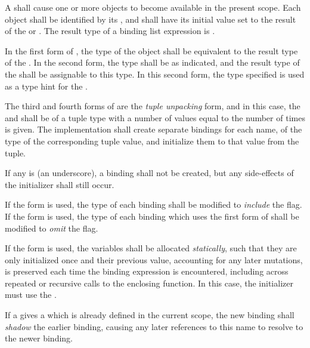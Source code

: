 \specsubsubitem
A  shall cause one or more objects to become
available in the present scope. Each object shall be identified by its
, and shall have its initial value set to the result of the
 or . The result
type of a binding list expression is .

\specsubsubitem
In the first form of , the type of the object shall
be equivalent to the result type of the . In the
second form, the type shall be as indicated, and the result type of the
 shall be assignable to this type. In this second form,
the type specified is used as a type hint for the .

\specsubsubitem
The third and fourth forms of  are the \textit{tuple
unpacking} form, and in this case, the  and
 shall be of a tuple type with a number of values equal
to the number of times  is given. The implementation shall
create separate bindings for each name, of the type of the corresponding tuple
value, and initialize them to that value from the tuple.

\specsubsubitem
If any  is \terminal{\_} (an underscore), a binding shall not
be created, but any side-effects of the initializer shall still occur.

\specsubsubitem
If the  form is used, the type of each binding shall be
modified to \textit{include} the  flag. If the 
form is used, the type of each binding which uses the first form of
 shall be modified to \textit{omit} the 
flag.

\specsubsubitem
If the  form is used, the variables shall be allocated
\textit{statically}, such that they are only initialized once and their
previous value, accounting for any later mutations, is preserved each time
the binding expression is encountered, including across repeated or recursive
calls to the enclosing function. In this case, the initializer must use the
.

\specsubsubitem
If a  gives a  which is already defined
in the current scope, the new binding shall \textit{shadow} the earlier
binding, causing any later references to this name to resolve to the newer
binding.

